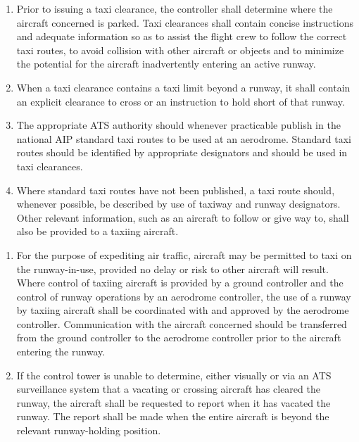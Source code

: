 \begin{enumeratesc}
    \begin{enumerate}[labelindent=0pt,itemsep=0.2cm]
        \begin{enumerate}
            \item Prior to issuing a taxi clearance, the controller shall determine where the aircraft concerned is parked. Taxi clearances shall contain concise instructions and adequate information so as to assist the flight crew to follow the correct taxi routes, to avoid collision with other aircraft or objects and to minimize the potential for the aircraft inadvertently entering an active runway.
            \item When a taxi clearance contains a taxi limit beyond a runway, it shall contain an explicit clearance to cross or an instruction to hold short of that runway.
            \item The appropriate ATS authority should whenever practicable publish in the national AIP standard taxi routes to be used at an aerodrome. Standard taxi routes should be identified by appropriate designators and should be used in taxi clearances.
            \item Where standard taxi routes have not been published, a taxi route should, whenever possible, be described by use of taxiway and runway designators. Other relevant information, such as an aircraft to follow or give way to, shall also be provided to a taxiing aircraft.
        \end{enumerate}

        \begin{enumerate}
            \item For the purpose of expediting air traffic, aircraft may be permitted to taxi on the runway-in-use, provided no delay or risk to other aircraft will result. Where control of taxiing aircraft is provided by a ground controller and the control of runway operations by an aerodrome controller, the use of a runway by taxiing aircraft shall be coordinated with and approved by the aerodrome controller. Communication with the aircraft concerned should be transferred from the ground controller to the aerodrome controller prior to the aircraft entering the runway.
            \item \label{7.6.3.1.2.2} If the control tower is unable to determine, either visually or via an ATS surveillance system that a vacating or crossing aircraft has cleared the runway, the aircraft shall be requested to report when it has vacated the runway. The report shall be made when the entire aircraft is beyond the relevant runway-holding position.
        \end{enumerate}


\end{enumerate}
\end{enumeratesc}
